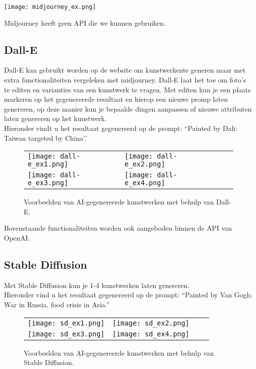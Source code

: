 \begin{center}
    \texttt{[image: midjourney\_ex.png]}
    \label{fig:midjourney_ex.png}
\end{center}

Midjourney heeft geen API die we kunnen gebruiken.

\subsection{ Dall-E}
Dall-E kan gebruikt worden op de website om kunstwerkente generen maar met extra functionaliteiten vergeleken met midjourney. Dall-E laat het toe om foto's te editen en varianties van een kunstwerk te vragen. Met editen kun je een plaats markeren op het gegenereerde resultaat en hierop een nieuwe promp laten genereren, op deze manier kun je bepaalde dingen aanpassen of nieuwe attributen laten genereren op het kunstwerk. \\

Hieronder vindt u het resultaat gegenereerd op de prompt: ``Painted by Dali: Taiwan targeted by China'.' \\

\begin{figure}[h!]
    \centering
    \begin{tabular}{llll}
        \texttt{[image: dall-e\_ex1.png]} &
        \texttt{[image: dall-e\_ex2.png]} \\
        \texttt{[image: dall-e\_ex3.png]} &
        \texttt{[image: dall-e\_ex4.png]}
    \end{tabular}
    \caption{Voorbeelden van AI-gegenereerde kunstwerken met behulp van Dall-E.}
    \label{fig:examples}
\end{figure}


 Bovenstaande functionaliteiten worden ook aangeboden binnen de API van OpenAI.
\pagebreak

\subsection{Stable Diffusion}
Met Stable Diffusion kun je 1-4 kunstwerken laten genereren. \\

Hieronder vind u het resultaat gegenereerd op de prompt:  ``Painted by Van Gogh: War in Russia, food crisis in Asia.''

\begin{figure}[h!]
    \centering
    \begin{tabular}{llll}
        \texttt{[image: sd\_ex1.png]} &
        \texttt{[image: sd\_ex2.png]} \\
        \texttt{[image: sd\_ex3.png]} &
        \texttt{[image: sd\_ex4.png]}
    \end{tabular}
    \caption{Voorbeelden van AI-gegenereerde kunstwerken met behulp van Stable Diffusion.}
    \label{fig:examples}
\end{figure}

